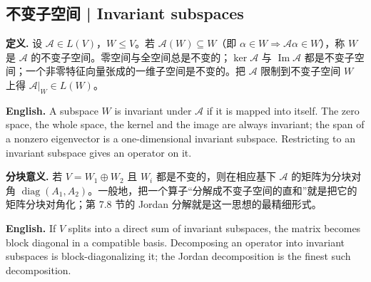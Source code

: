 \documentclass[UTF8,11pt,a4paper]{ctexart}
\newcommand{\EN}[1]{\par\noindent\textbf{English.} #1\par}
\begin{document}
\subsection{不变子空间 | Invariant subspaces}
\noindent\textbf{定义.} 设 $\mathcal A\in L(V)$，$W\le V$。若 $\mathcal A(W)\subseteq W$（即 $\alpha\in W\Rightarrow\mathcal A\alpha\in W$），称 $W$ 是 $\mathcal A$ 的不变子空间。零空间与全空间总是不变的；$\ker\mathcal A$ 与 $\operatorname{Im}\mathcal A$ 都是不变子空间；一个非零特征向量张成的一维子空间是不变的。把 $\mathcal A$ 限制到不变子空间 $W$ 上得 $\mathcal A|_W\in L(W)$。
\EN{A subspace $W$ is invariant under $\mathcal A$ if it is mapped into itself. The zero space, the whole space, the kernel and the image are always invariant; the span of a nonzero eigenvector is a one-dimensional invariant subspace. Restricting to an invariant subspace gives an operator on it.}
\noindent\textbf{分块意义.} 若 $V=W_1\oplus W_2$ 且 $W_i$ 都是不变的，则在相应基下 $\mathcal A$ 的矩阵为分块对角 $\operatorname{diag}(A_1,A_2)$。一般地，把一个算子“分解成不变子空间的直和”就是把它的矩阵分块对角化；第 7.8 节的 Jordan 分解就是这一思想的最精细形式。
\EN{If $V$ splits into a direct sum of invariant subspaces, the matrix becomes block diagonal in a compatible basis. Decomposing an operator into invariant subspaces is block-diagonalizing it; the Jordan decomposition is the finest such decomposition.}
\end{document}
